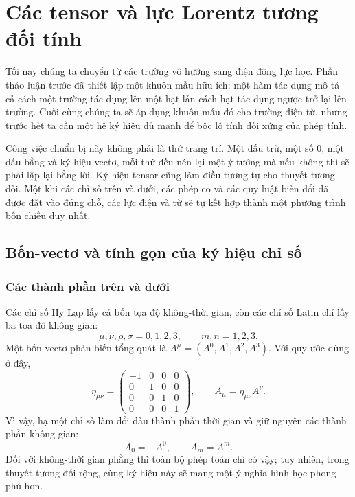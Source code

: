 \chapter{Các tensor và lực Lorentz tương đối tính}

Tối nay chúng ta chuyển từ các trường vô hướng sang điện động lực học. Phần thảo luận trước đã thiết lập một khuôn mẫu hữu ích: một hàm tác dụng mô tả cả cách một trường tác dụng lên một hạt lẫn cách hạt tác dụng ngược trở lại lên trường. Cuối cùng chúng ta sẽ áp dụng khuôn mẫu đó cho trường điện từ, nhưng trước hết ta cần một hệ ký hiệu đủ mạnh để bộc lộ tính đối xứng của phép tính.

Công việc chuẩn bị này không phải là thứ trang trí. Một dấu trừ, một số 0, một dấu bằng và ký hiệu vectơ, mỗi thứ đều nén lại một ý tưởng mà nếu không thì sẽ phải lặp lại bằng lời. Ký hiệu tensor cũng làm điều tương tự cho thuyết tương đối. Một khi các chỉ số trên và dưới, các phép co và các quy luật biến đổi đã được đặt vào đúng chỗ, các lực điện và từ sẽ tự kết hợp thành một phương trình bốn chiều duy nhất.

\section{Bốn-vectơ và tính gọn của ký hiệu chỉ số}

\subsection{Các thành phần trên và dưới}

Các chỉ số Hy Lạp lấy cả bốn tọa độ không-thời gian, còn các chỉ số Latin chỉ lấy ba tọa độ không gian:
\begin{equation}
\mu,\nu,\rho,\sigma=0,1,2,3,
\qquad
m,n=1,2,3.
\end{equation}
Một bốn-vectơ phản biến tổng quát là \(A^\mu=(A^0,A^1,A^2,A^3)\).
Với quy ước dùng ở đây,
\begin{equation}
\eta_{\mu\nu}
=
\begin{pmatrix}
-1&0&0&0\\
0&1&0&0\\
0&0&1&0\\
0&0&0&1
\end{pmatrix},
\qquad
A_\mu=\eta_{\mu\nu}A^\nu .
\label{eq:sr6-metric-lowering}
\end{equation}
Vì vậy, hạ một chỉ số làm đổi dấu thành phần thời gian và giữ nguyên các thành phần không gian:
\begin{equation}
A_0=-A^0,
\qquad
A_m=A^m.
\label{eq:sr6-component-lowering}
\end{equation}
Đối với không-thời gian phẳng thì toàn bộ phép toán chỉ có vậy; tuy nhiên, trong thuyết tương đối rộng, cùng ký hiệu này sẽ mang một ý nghĩa hình học phong phú hơn.

